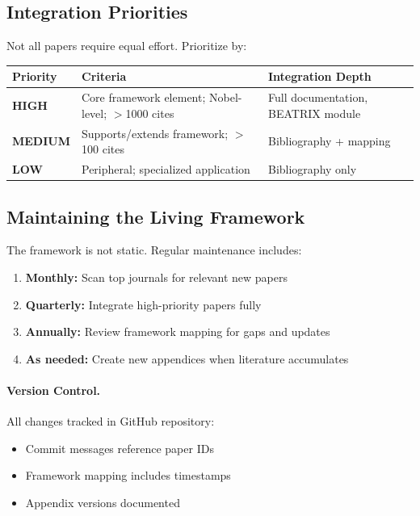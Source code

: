 \subsection{Integration Priorities}

Not all papers require equal effort. Prioritize by:

\begin{center}
\renewcommand{\arraystretch}{1.3}
\begin{tabular}{|l|l|l|}
\hline
\textbf{Priority} & \textbf{Criteria} & \textbf{Integration Depth} \\
\hline
\textbf{HIGH} & Core framework element; Nobel-level; $>$1000 cites & Full documentation, BEATRIX module \\
\textbf{MEDIUM} & Supports/extends framework; $>$100 cites & Bibliography + mapping \\
\textbf{LOW} & Peripheral; specialized application & Bibliography only \\
\hline
\end{tabular}
\end{center}

\subsection{Maintaining the Living Framework}

The framework is not static. Regular maintenance includes:

\begin{enumerate}
  \item \textbf{Monthly:} Scan top journals for relevant new papers
  \item \textbf{Quarterly:} Integrate high-priority papers fully
  \item \textbf{Annually:} Review framework mapping for gaps and updates
  \item \textbf{As needed:} Create new appendices when literature accumulates
\end{enumerate}

\paragraph{Version Control.}
All changes tracked in GitHub repository:
\begin{itemize}
  \item Commit messages reference paper IDs
  \item Framework mapping includes timestamps
  \item Appendix versions documented
\end{itemize}

